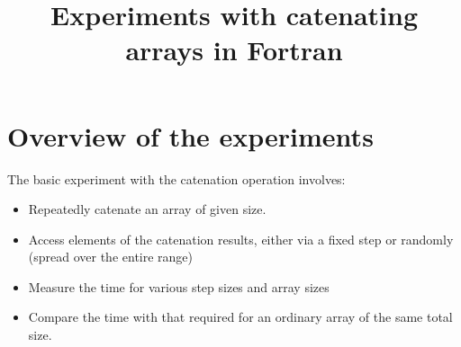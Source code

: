 \documentclass[onecolumn]{article}
\begin{document}
\title{Experiments with catenating arrays in Fortran}
\maketitle

\section{Overview of the experiments}

The basic experiment with the catenation operation involves:
\begin{itemize}
\item
Repeatedly catenate an array of given size.
\item
Access elements of the catenation results, either via a fixed step or randomly (spread over
the entire range)
\item
Measure the time for various step sizes and array sizes
\item
Compare the time with that required for an ordinary array of the same total size.
\end{itemize}
\end{document}
